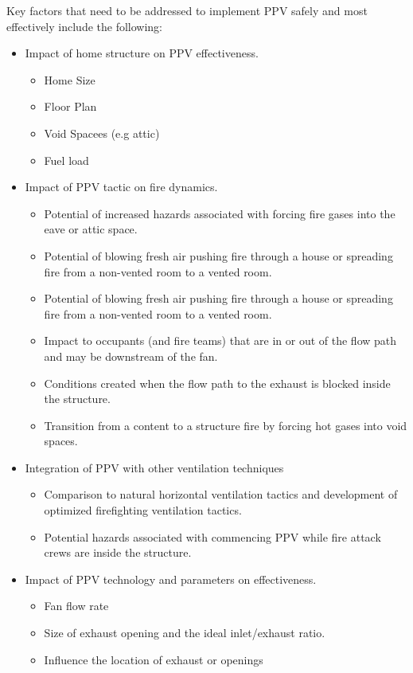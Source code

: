 \documentclass{article}
\begin{document}
Key factors that need to be addressed to implement PPV safely and most effectively include
the following:

\begin{itemize}
	\item Impact of home structure on PPV effectiveness.
	\begin{itemize}
		\item Home Size
		\item Floor Plan
		\item Void Spacees (e.g attic)
		\item Fuel load
	\end{itemize}
	\item Impact of PPV tactic on fire dynamics.
	\begin{itemize}
		\item Potential of increased hazards associated with forcing fire gases into the eave or attic space.
		\item Potential of blowing fresh air pushing fire through a house or spreading fire from a non-vented room to a vented room.
		\item Potential of blowing fresh air pushing fire through a house or spreading fire from a non-vented room to a vented room.
		\item Impact to occupants (and fire teams) that are in or out of the flow path and may be downstream of the fan.
		\item Conditions created when the flow path to the exhaust is blocked inside the structure.
		\item Transition from a content to a structure fire by forcing hot gases into void spaces.
	\end{itemize}
	\item Integration of PPV with other ventilation techniques
	\begin{itemize}
		\item Comparison to natural horizontal ventilation tactics and development of optimized firefighting ventilation tactics.
		\item Potential hazards associated with commencing PPV while fire attack crews are inside the structure.
	\end{itemize}
	\item Impact of PPV technology and parameters on effectiveness.
	\begin{itemize}
		\item Fan flow rate
		\item Size of exhaust opening and the ideal inlet/exhaust ratio.
		\item Influence the location of exhaust or openings
	\end{itemize}
\end{itemize}
\end{document}
